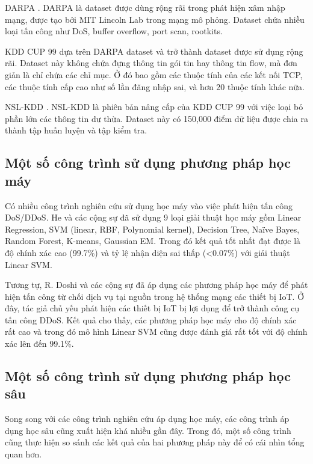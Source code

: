 DARPA \cite{39-Lippmann}. DARPA là dataset được dùng rộng rãi trong phát hiện xâm nhập mạng, được tạo bởi MIT Lincoln Lab trong mạng mô phỏng. Dataset chứa nhiều loại tấn công như DoS, buffer overflow, port scan, rootkits.

KDD CUP 99 \cite{38-Stolfo} dựa trên DARPA dataset và trở thành dataset được sử dụng rộng rãi. Dataset này không chứa đựng thông tin gói tin hay thông tin flow, mà đơn giản là chỉ chứa các chỉ mục. Ở đó bao gồm các thuộc tính của các kết nối TCP, các thuộc tính cấp cao như số lần đăng nhập sai, và hơn 20 thuộc tính khác nữa.

NSL-KDD \cite{40-Tavallaee}. NSL-KDD là phiên bản nâng cấp của KDD CUP 99 với việc loại bỏ phần lớn các thông tin dư thừa. Dataset này có 150,000 điểm dữ liệu được chia ra thành tập huấn luyện và tập kiểm tra.

\subsection{Một số công trình sử dụng phương pháp học máy}

Có nhiều công trình nghiên cứu sử dụng học máy vào việc phát hiện tấn công DoS/DDoS.
He và các cộng sự \cite{41-He} đã sử dụng 9 loại giải thuật học máy gồm Linear Regression, SVM (linear, RBF, Polynomial kernel), Decision Tree, Naïve Bayes, Random Forest, K-means, Gaussian EM. Trong đó kết quả tốt nhất đạt được là độ chính xác cao (99.7\%) và tỷ lệ nhận diện sai thấp (<0.07\%) với giải thuật Linear SVM.

Tương tự, R. Doshi và các cộng sự \cite{42-Doshi} đã áp dụng các phương pháp học máy để phát hiện tấn công từ chối dịch vụ tại nguồn trong hệ thống mạng các thiết bị IoT. Ở đây, tác giả chủ yếu phát hiện các thiết bị IoT bị lợi dụng để trở thành công cụ tấn công DDoS. Kết quả cho thấy, các phương pháp học máy cho độ chính xác rất cao và trong đó mô hình Linear SVM cũng được đánh giá rất tốt với độ chính xác lên đến 99.1\%.

\subsection{Một số công trình sử dụng phương pháp học sâu}

Song song với các công trình nghiên cứu áp dụng học máy, các công trình áp dụng học sâu cũng xuất hiện khá nhiều gần đây. Trong đó, một số công trình cũng thực hiện so sánh các kết quả của hai phương pháp này để có cái nhìn tổng quan hơn.

